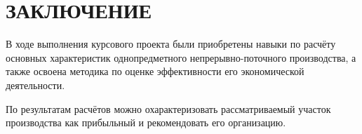 \section*{ЗАКЛЮЧЕНИЕ}

В ходе выполнения курсового проекта были приобретены навыки по расчёту основных
характеристик однопредметного непрерывно-поточного производства,
а также освоена методика по оценке эффективности его экономической
деятельности.

По результатам расчётов можно охарактеризовать рассматриваемый участок производства
как прибыльный и рекомендовать его организацию.
